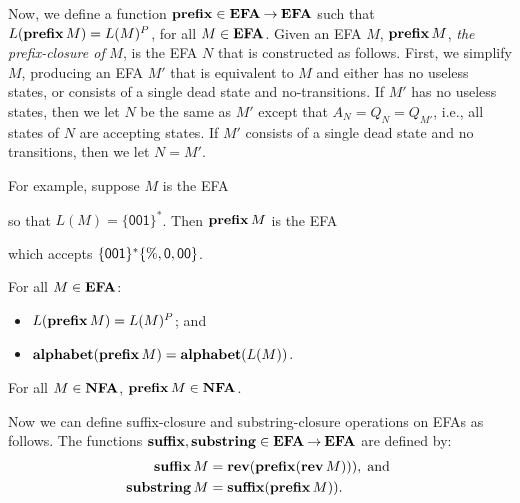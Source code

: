 Now, we define a function $\mathbf{prefix}\in\mathbf{EFA}\mathbin{\to}\mathbf{EFA}$ such that
%
%
%
%
$L(\mathbf{prefix}\,M)=L(M)^P$, for all $M\in\mathbf{EFA}$.  Given an EFA $M$,
$\mathbf{prefix}\,M$, \emph{the prefix-closure of} $M$,
is the EFA $N$ that is constructed as follows.
First, we simplify $M$, producing an EFA $M'$ that is equivalent to
$M$ and either has no useless states, or consists of a single dead
state and no-transitions.
If $M'$ has no useless states, then we let $N$ be the same as $M'$
except that $A_N = Q_N=Q_{M'}$,
i.e., all states of $N$ are accepting states.
If $M'$ consists of a single dead state and no transitions,
then we let $N=M'$.

For example, suppose $M$ is the EFA
\begin{center}

\end{center}
so that $L(M)=\{\mathsf{001}\}^*$.  Then
$\mathbf{prefix}\,M$ is the EFA
\begin{center}

\end{center}
which accepts
$\{\mathsf{001}\}^*\{\%,\mathsf{0},\mathsf{0}\mathsf{0}\}$.

\begin{theorem}
\label{EFAPrefix}
For all $M\in\mathbf{EFA}$:
\begin{itemize}
\item $L(\mathbf{prefix}\,M) = L(M)^P$; and

\item $\mathbf{alphabet}(\mathbf{prefix}\,M) = \mathbf{alphabet}(L(M))$.
\end{itemize}
\end{theorem}

\begin{proposition}
For all $M\in\mathbf{NFA}$, $\mathbf{prefix}\,M\in\mathbf{NFA}$.
\end{proposition}
%
%
%

Now we can define suffix-closure and substring-closure
operations on EFAs as follows.  The functions $\mathbf{suffix},\mathbf{substring}\in
\mathbf{EFA}\mathbin{\to}\mathbf{EFA}$ are defined by:
%
%
%
%
%
%
\begin{align*}
\mathbf{suffix}\,M &= \mathbf{rev}(\mathbf{prefix}(\mathbf{rev}\,M))) , \;\allowbreak\mbox{and}\allowbreak\; \\
\mathbf{substring}\,M &= \mathbf{suffix}(\mathbf{prefix}\,M)) .
\end{align*}

